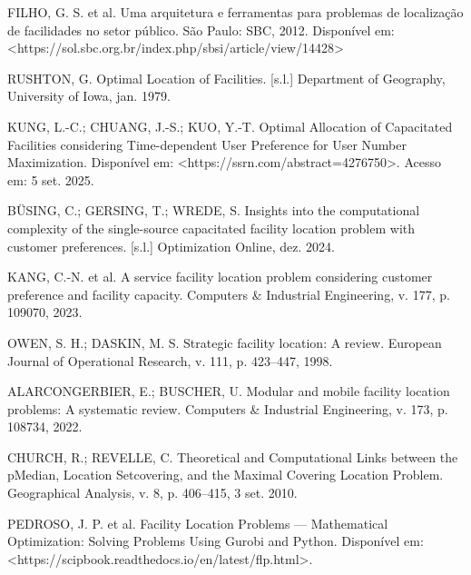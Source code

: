 \documentclass[12pt]{article}
\begin{document}
\begin{thebibliography}{99}

 FILHO, G. S. et al. Uma arquitetura e ferramentas para problemas de localização de facilidades no setor público. São Paulo: SBC, 2012. Disponível em: <https://sol.sbc.org.br/index.php/sbsi/article/view/14428>

 RUSHTON, G. Optimal Location of Facilities. [s.l.] Department of Geography, University of Iowa, jan. 1979.

 KUNG, L.-C.; CHUANG, J.-S.; KUO, Y.-T. Optimal Allocation of Capacitated Facilities considering Time-dependent User Preference for User Number Maximization. Disponível em: <https://ssrn.com/abstract=4276750>. Acesso em: 5 set. 2025. 

 BÜSING, C.; GERSING, T.; WREDE, S. Insights into the computational complexity of the single-source capacitated facility location problem with customer preferences. [s.l.] Optimization Online, dez. 2024. 

 KANG, C.-N. et al. A service facility location problem considering customer preference and facility capacity. Computers \& Industrial Engineering, v. 177, p. 109070, 2023.

 OWEN, S. H.; DASKIN, M. S. Strategic facility location: A review. European Journal of Operational Research, v. 111, p. 423–447, 1998. 

 ALARCONGERBIER, E.; BUSCHER, U. Modular and mobile facility location problems: A systematic review. Computers \& Industrial Engineering, v. 173, p. 108734, 2022. 

 CHURCH, R.; REVELLE, C. Theoretical and Computational Links between the pMedian, Location Setcovering, and the Maximal Covering Location Problem. Geographical Analysis, v. 8, p. 406–415, 3 set. 2010. 

 PEDROSO, J. P. et al. Facility Location Problems — Mathematical Optimization: Solving Problems Using Gurobi and Python. Disponível em: <https://scipbook.readthedocs.io/en/latest/flp.html>.

\end{thebibliography}
\end{document}
